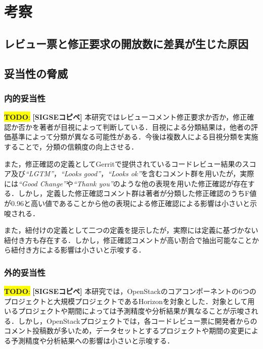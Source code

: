 \documentclass[11pt]{jreport}
\newcommand{\todo}[1]{\colorbox{yellow}{{\bf TODO}:}{\color{red} {\textbf{[#1]}}}}
\begin{document}
\chapter{考察}

\section{レビュー票と修正要求の開放数に差異が生じた原因}

\section{妥当性の脅威}
\subsection{内的妥当性}

\todo{SIGSEコピペ}
本研究ではレビューコメント修正要求か否か，修正確認か否かを著者が目視によって判断している．目視による分類結果は，他者の評価基準によって分類が異なる可能性がある．今後は複数人による目視分類を実施することで，分類の信頼度の向上させる．

また，修正確認の定義としてGerritで提供されているコードレビュー結果のスコア及び\textit{``LGTM''}，\textit{``Looks good''}，\textit{``Looks ok''}を含むコメント群を用いたが，実際には\textit{``Good Change''}や\textit{``Thank you''}のような他の表現を用いた修正確認が存在する．しかし，定義した修正確認コメント群は著者が分類した修正確認のうちF値が0.96と高い値であることから他の表現による修正確認による影響は小さいと示唆される．

また，紐付けの定義として二つの定義を提示したが，実際には定義に基づかない紐付き方も存在する．しかし，修正確認コメントが高い割合で抽出可能なことから紐付き方による影響は小さいと示唆する．

\subsection{外的妥当性}

\todo{SIGSEコピペ}
本研究では，OpenStackのコアコンポーネントの6つのプロジェクトと大規模プロジェクトであるHorizonを対象とした．対象として用いるプロジェクトや期間によっては予測精度や分析結果が異なることが示唆される．しかし，OpenStackプロジェクトでは，各コードレビュー票に開発者からのコメント投稿数が多いため，データセットとするプロジェクトや期間の変更による予測精度や分析結果への影響は小さいと示唆する．
\end{document}

